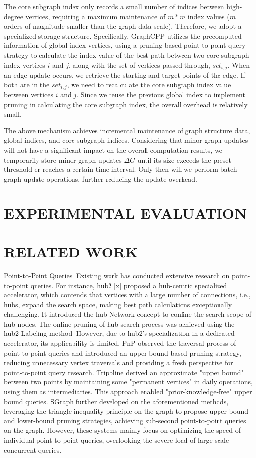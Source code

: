 \documentclass[lettersize,journal]{IEEEtran} %
\begin{document}
The core subgraph index only records a small number of indices between high-degree vertices, requiring a maximum maintenance of $m*m$ index values ($m$ orders of magnitude smaller than the graph data scale). Therefore, we adopt a specialized storage structure. Specifically, GraphCPP utilizes the precomputed information of global index vertices, using a pruning-based point-to-point query strategy to calculate the index value of the best path between two core subgraph index vertices $i$ and $j$, along with the set of vertices passed through, $set_{i,j}$. When an edge update occurs, we retrieve the starting and target points of the edge. If both are in the $set_{i,j}$, we need to recalculate the core subgraph index value between vertices $i$ and $j$. Since we reuse the previous global index to implement pruning in calculating the core subgraph index, the overall overhead is relatively small.

The above mechanism achieves incremental maintenance of graph structure data, global indices, and core subgraph indices. Considering that minor graph updates will not have a significant impact on the overall computation results, we temporarily store minor graph updates $\Delta G$ until its size exceeds the preset threshold or reaches a certain time interval. Only then will we perform batch graph update operations, further reducing the update overhead.


\section{EXPERIMENTAL EVALUATION}

\section{RELATED WORK}
Point-to-Point Queries: Existing work has conducted extensive research on point-to-point queries. For instance, hub2 [x] proposed a hub-centric specialized accelerator, which contends that vertices with a large number of connections, i.e., hubs, expand the search space, making best path calculations exceptionally challenging. It introduced the hub-Network concept to confine the search scope of hub nodes. The online pruning of hub search process was achieved using the hub2-Labeling method. However, due to hub2's specialization in a dedicated accelerator, its applicability is limited. PnP observed the traversal process of point-to-point queries and introduced an upper-bound-based pruning strategy, reducing unnecessary vertex traversals and providing a fresh perspective for point-to-point query research. Tripoline derived an approximate "upper bound" between two points by maintaining some "permanent vertices" in daily operations, using them as intermediaries. This approach enabled "prior-knowledge-free" upper bound queries. SGraph further developed on the aforementioned methods, leveraging the triangle inequality principle on the graph to propose upper-bound and lower-bound pruning strategies, achieving sub-second point-to-point queries on the graph. However, these systems mainly focus on optimizing the speed of individual point-to-point queries, overlooking the severe load of large-scale concurrent queries.
\end{document}
